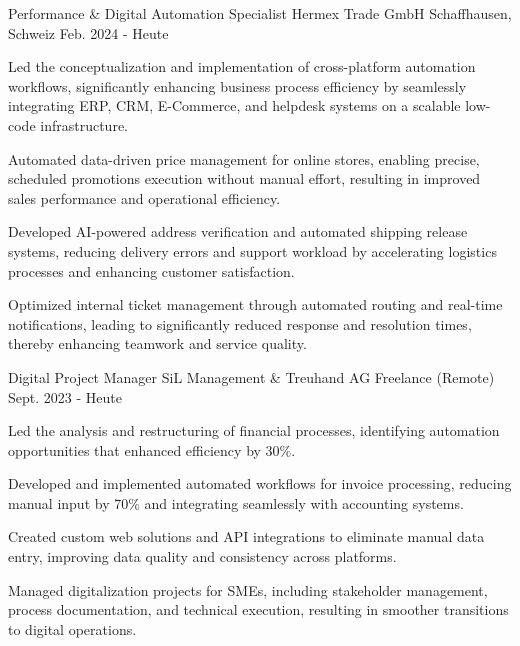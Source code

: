 

\begin{cventries}
\cventry
  {Performance \& Digital Automation Specialist}
  {Hermex Trade GmbH}
  {Schaffhausen, Schweiz}
  {Feb. 2024 - Heute}
  {
    \begin{cvitems}
\item {Led the conceptualization and implementation of cross-platform automation workflows, significantly enhancing business process efficiency by seamlessly integrating ERP, CRM, E-Commerce, and helpdesk systems on a scalable low-code infrastructure.}
\item {Automated data-driven price management for online stores, enabling precise, scheduled promotions execution without manual effort, resulting in improved sales performance and operational efficiency.}
\item {Developed AI-powered address verification and automated shipping release systems, reducing delivery errors and support workload by accelerating logistics processes and enhancing customer satisfaction.}
\item {Optimized internal ticket management through automated routing and real-time notifications, leading to significantly reduced response and resolution times, thereby enhancing teamwork and service quality.}
\end{cvitems}
  }

\cventry
  {Digital Project Manager}
  {SiL Management \& Treuhand AG}
  {Freelance (Remote)}
  {Sept. 2023 - Heute}
  {
    \begin{cvitems}
\item {Led the analysis and restructuring of financial processes, identifying automation opportunities that enhanced efficiency by 30\%.}
\item {Developed and implemented automated workflows for invoice processing, reducing manual input by 70\% and integrating seamlessly with accounting systems.}
\item {Created custom web solutions and API integrations to eliminate manual data entry, improving data quality and consistency across platforms.}
\item {Managed digitalization projects for SMEs, including stakeholder management, process documentation, and technical execution, resulting in smoother transitions to digital operations.}
\end{cvitems}
  }


\end{cventries}

